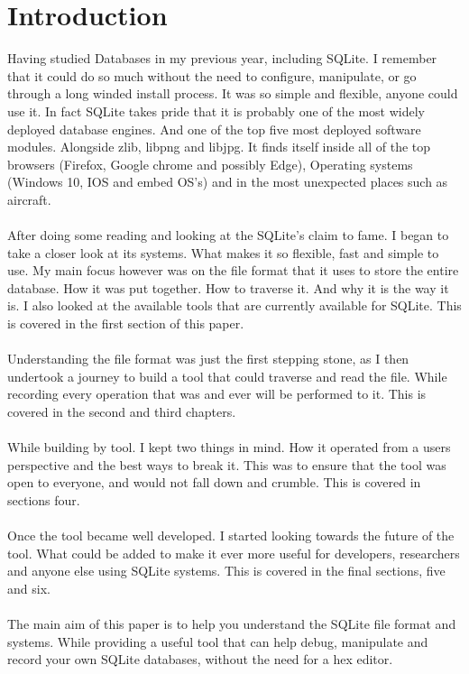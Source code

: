 \section*{Introduction}
\label{sec:introduction}

Having studied Databases in my previous year, including SQLite. I remember that it could do so much without the need to configure, manipulate, or go through a long winded install process. It was so simple and flexible, anyone could use it. In fact SQLite takes pride that it is probably one of the most widely deployed database engines. And one of the top five most deployed software modules. Alongside zlib, libpng and libjpg. It finds itself inside all of the top browsers (Firefox, Google chrome and possibly Edge), Operating systems (Windows 10, IOS and embed OS's) and in the most unexpected places such as aircraft.
\\\\
After doing some reading and looking at the SQLite's claim to fame. I began to take a closer look at its systems. What makes it so flexible, fast and simple to use. My main focus however was on the file format that it uses to store the entire database. How it was put together. How to traverse it. And why it is the way it is. I also looked at the available tools that are currently available for SQLite. This is covered in the first section of this paper.
\\\\
Understanding the file format was just the first stepping stone, as I then undertook a journey to build a tool that could traverse and read the file. While recording every operation that was and ever will be performed to it. This is covered in the second and third chapters.
\\\\
While building by tool. I kept two things in mind. How it operated from a users perspective and the best ways to break it. This was to ensure that the tool was open to everyone, and would not fall down and crumble. This is covered in sections four. 
\\\\
Once the tool became well developed. I started looking towards the future of the tool. What could be added to make it ever more useful for developers, researchers and anyone else using SQLite systems. This is covered in the final sections, five and six.
\\\\
The main aim of this paper is to help you understand the SQLite file format and systems. While providing a useful tool that can help debug, manipulate and record your own SQLite databases, without the need for a hex editor.
